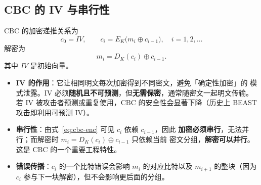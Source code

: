 \subsection{CBC 的 IV 与串行性}

CBC 的加密递推关系为
\begin{equation}
    c_0 = IV, \qquad c_i = E_K\bigl(m_i \oplus c_{i-1}\bigr),\quad i = 1,2,\dots
    \label{eq:cbc-enc}
\end{equation}
解密为
\begin{equation}
    m_i = D_K(c_i) \oplus c_{i-1}.
    \label{eq:cbc-dec}
\end{equation}
其中 $IV$ 是初始向量。

\begin{itemize}
    \item \textbf{IV 的作用}：它让相同明文每次加密得到不同密文，避免「确定性加密」的
    模式泄露。IV 必须\textbf{随机且不可预测}，但\textbf{无需保密}，通常随密文一起明文传输。
    若 IV 被攻击者预测或重复使用，CBC 的安全性会显著下降（历史上 BEAST 攻击即利用可预测 IV）。
    \item \textbf{串行性}：由式~\eqref{eq:cbc-enc} 可见 $c_i$ 依赖 $c_{i-1}$，因此
    \textbf{加密必须串行}，无法并行；而解密时 $m_i = D_K(c_i)\oplus c_{i-1}$ 只依赖当前
    密文分组，\textbf{解密可以并行}。这是 CBC 的一个重要工程特性。
    \item \textbf{错误传播}：$c_i$ 的一个比特错误会影响 $m_i$ 的对应比特以及 $m_{i+1}$
    的整块（因为 $c_i$ 参与下一块解密），但不会影响更后面的分组。
\end{itemize}

